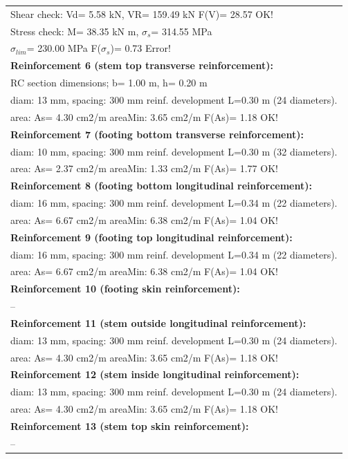 \begin{center}
\begin{supertabular}[H]{|l|}
  Shear check: Vd=   5.58 kN,  VR= 159.49 kN  F(V)= 28.57 OK!\\
  Stress check: M=  38.35 kN m, $\sigma_s$= 314.55 MPa\\
    $\sigma_{lim}$= 230.00 MPa  F($\sigma_s$)= 0.73 Error!\\
\textbf{Reinforcement 6 (stem top transverse reinforcement):}\\
  RC section dimensions; b= 1.00 m, h= 0.20 m\\
  diam: 13 mm, spacing: 300 mm  reinf. development L=0.30 m (24 diameters).\\
  area: As=   4.30 cm2/m areaMin:   3.65 cm2/m  F(As)= 1.18 OK!\\
\textbf{Reinforcement 7 (footing bottom transverse reinforcement):}\\
  diam: 10 mm, spacing: 300 mm  reinf. development L=0.30 m (32 diameters).\\
  area: As=   2.37 cm2/m areaMin:   1.33 cm2/m  F(As)= 1.77 OK!\\
\textbf{Reinforcement 8 (footing bottom longitudinal reinforcement):}\\
  diam: 16 mm, spacing: 300 mm  reinf. development L=0.34 m (22 diameters).\\
  area: As=   6.67 cm2/m areaMin:   6.38 cm2/m  F(As)= 1.04 OK!\\
\textbf{Reinforcement 9 (footing top longitudinal reinforcement):}\\
  diam: 16 mm, spacing: 300 mm  reinf. development L=0.34 m (22 diameters).\\
  area: As=   6.67 cm2/m areaMin:   6.38 cm2/m  F(As)= 1.04 OK!\\
\textbf{Reinforcement 10 (footing skin reinforcement):}\\
  --\\
\textbf{Reinforcement 11 (stem outside longitudinal reinforcement):}\\
  diam: 13 mm, spacing: 300 mm  reinf. development L=0.30 m (24 diameters).\\
  area: As=   4.30 cm2/m areaMin:   3.65 cm2/m  F(As)= 1.18 OK!\\
\textbf{Reinforcement 12 (stem inside longitudinal reinforcement):}\\
  diam: 13 mm, spacing: 300 mm  reinf. development L=0.30 m (24 diameters).\\
  area: As=   4.30 cm2/m areaMin:   3.65 cm2/m  F(As)= 1.18 OK!\\
\textbf{Reinforcement 13 (stem top skin reinforcement):}\\
  --\\
\hline
\end{supertabular}
\end{center}

